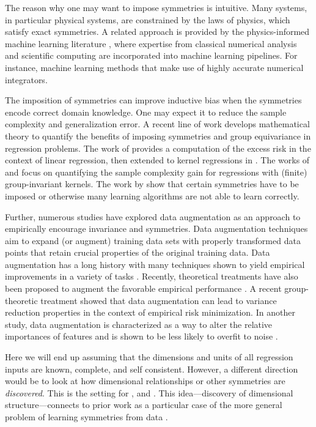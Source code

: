 \documentclass[twoside,11pt]{article}
\begin{document}
The reason why one may want to impose symmetries is intuitive. Many systems, in particular physical systems, are constrained by the laws of physics, which satisfy exact symmetries. A related approach is provided by the physics-informed machine learning literature \citep{karniadakis2021physics}, where expertise from classical numerical analysis and scientific computing are incorporated into machine learning pipelines. For instance, machine learning methods that make use of highly accurate numerical integrators.

The imposition of symmetries can improve inductive bias when the symmetries encode correct domain knowledge. 
One may expect it to reduce the sample complexity and generalization error.  A recent line of work develops mathematical theory to quantify the benefits of imposing symmetries and group equivariance in regression problems. The work of \citet{elesedy2021provably} provides a computation of the excess risk in the context of linear regression, then extended to kernel regressions in \citet{elesedy_kernel}. The works of \citet{bietti2021sample} and \citet{mei2021learning} focus on quantifying the sample complexity gain for regressions with (finite) group-invariant kernels. The work by \cite{brugiapaglia2021invariance} show that certain symmetries have to be imposed or otherwise many learning algorithms are not able to learn correctly.

Further, numerous studies have explored data augmentation as an approach to empirically encourage invariance and symmetries. Data augmentation techniques aim to expand (or augment) training data sets with properly transformed data points that retain crucial properties of the original training data. Data augmentation has a long history \citep{baird1992document, van2001art} with many techniques shown to yield empirical improvements in a variety of tasks \citep{wong2016understanding, cubuk2018autoaugment, cubuk2020randaugment}. Recently, theoretical treatments have also been proposed to augment the favorable empirical performance \citep{dao2019kernel, chen2020group,shen2022data}. A recent group-theoretic treatment \citep{chen2020group} showed that data augmentation can lead to variance reduction properties in the context of empirical risk minimization. In another study, data augmentation is characterized as a way to alter the relative importances of features and is shown to be less likely to overfit to noise \citep{shen2022data}.

Here we will end up assuming that the dimensions and units of all regression inputs are known, complete, and self consistent. However, a different direction would be to look at how dimensional relationships or other symmetries are \emph{discovered}. This is the setting for \citet{constantine2017data}, and \citet{evangelou2021parameter}. This idea---discovery of dimensional structure---connects to prior work as a particular case of the more general problem of learning symmetries from data \citep{benton2020learning, cahill2020lie}.
\end{document}
